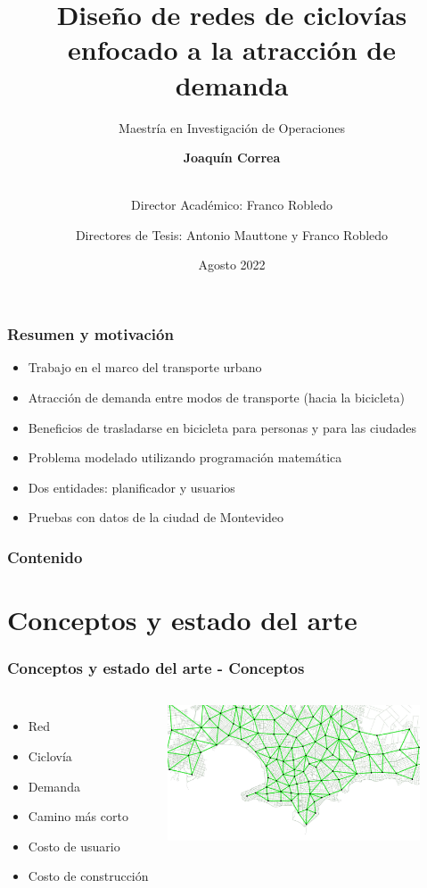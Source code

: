 \documentclass[aspectratio=43, 10pt]{beamer}
\title{Diseño de redes de ciclovías enfocado a la atracción de demanda}
\subtitle{Maestría en Investigación de Operaciones}
\author{
    \textbf{Joaquín Correa} \\\\
    \and
    Director Académico: Franco Robledo \\
    \and
    Directores de Tesis: Antonio Mauttone y Franco Robledo \\
}
\institute{Facultad de Ingeniería, Universidad de la República}
\date{Agosto 2022}
\begin{document}
\maketitle

\begin{frame}
    \frametitle{Resumen y motivación}

    \begin{itemize}
    \item{Trabajo en el marco del transporte urbano}
    \item{Atracción de demanda entre modos de transporte (hacia la bicicleta)}
    \item{Beneficios de trasladarse en bicicleta para personas y para las ciudades}
    \item{Problema modelado utilizando programación matemática}
    \item{Dos entidades: planificador y usuarios}
    \item{Pruebas con datos de la ciudad de Montevideo}
    \end{itemize}
\end{frame}

\begin{frame}
    \frametitle{Contenido}
    \tableofcontents
\end{frame}

\section{Conceptos y estado del arte}

\begin{frame}
    \frametitle{Conceptos y estado del arte - Conceptos}

    \begin{columns}[c]
            \begin{itemize}
            \item{Red}
            \item{Ciclovía}
            \item{Demanda}
            \item{Camino más corto}
            \item{Costo de usuario}
            \item{Costo de construcción}
            \end{itemize}
            \includegraphics[height=4cm,width=\textwidth]{images/mvd_red.png}
    \end{columns}
\end{frame}
\end{document}
